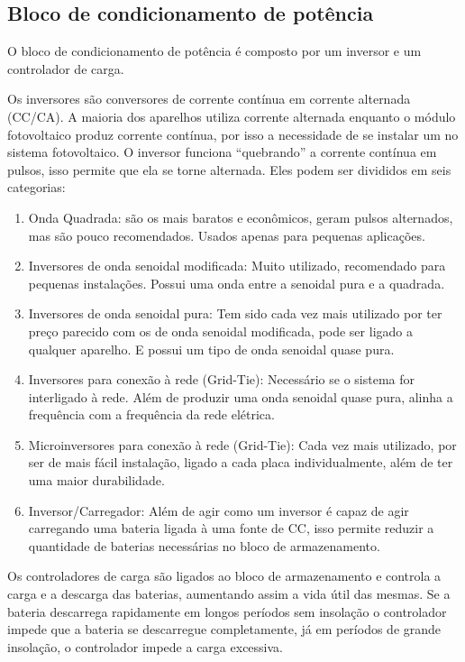 \subsection{Bloco de condicionamento de potência}

O bloco de condicionamento de potência é composto por um inversor e um controlador de carga.

Os inversores são conversores de corrente contínua em corrente alternada (CC/CA). A maioria dos aparelhos utiliza corrente alternada enquanto o módulo fotovoltaico produz corrente contínua, por isso a necessidade de se instalar um no sistema fotovoltaico. O inversor funciona “quebrando” a corrente contínua em pulsos, isso permite que ela se torne alternada. Eles podem ser divididos em seis categorias:

\begin{enumerate}
    \item Onda Quadrada: são os mais baratos e econômicos, geram pulsos alternados, mas são pouco recomendados. Usados apenas para pequenas aplicações.
	\item Inversores de onda senoidal modificada: Muito utilizado, recomendado para pequenas instalações. Possui uma onda entre a senoidal pura e a quadrada.
	\item Inversores de onda senoidal pura: Tem sido cada vez mais utilizado por ter preço parecido com os de onda senoidal modificada, pode ser ligado a qualquer aparelho. E possui um tipo de onda senoidal quase pura. 
	\item Inversores para conexão à rede (Grid-Tie): Necessário se o sistema for interligado à rede. Além de produzir uma onda senoidal quase pura, alinha a frequência com a frequência da rede elétrica.
	\item Microinversores para conexão à rede (Grid-Tie): Cada vez mais utilizado, por ser de mais fácil instalação, ligado a cada placa individualmente, além de ter uma maior durabilidade.
	\item Inversor/Carregador: Além de agir como um inversor é capaz de agir carregando uma bateria ligada à uma fonte de CC, isso permite reduzir a quantidade de baterias necessárias no bloco de armazenamento.
\end{enumerate}

Os controladores de carga são ligados ao bloco de armazenamento e controla a carga e a descarga das baterias, aumentando assim a vida útil das mesmas. Se a bateria descarrega rapidamente em longos períodos sem insolação o controlador impede que a bateria se descarregue completamente, já em períodos de grande insolação, o controlador impede a carga excessiva.

